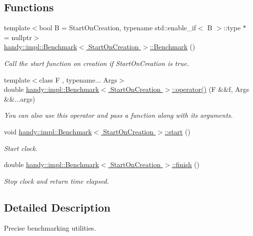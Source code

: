 \subsection*{Functions}
\begin{DoxyCompactItemize}
\item 
{\footnotesize template$<$bool B = Start\+On\+Creation, typename std\+::enable\+\_\+if$<$ B $>$\+::type $\ast$  = nullptr$>$ }\\\hyperlink{group__BenchmarkGroup_ga1ba032700225aabb43579c633d7838b1}{handy\+::impl\+::\+Benchmark$<$ Start\+On\+Creation $>$\+::\+Benchmark} ()
\begin{DoxyCompactList}\small\item\em Call the start function on creation if {\ttfamily Start\+On\+Creation} is {\ttfamily true}. \end{DoxyCompactList}\item 
{\footnotesize template$<$class F , typename... Args$>$ }\\double \hyperlink{group__BenchmarkGroup_ga5eee042d87e75a24021ad6851a2c10ec}{handy\+::impl\+::\+Benchmark$<$ Start\+On\+Creation $>$\+::operator()} (F \&\&f, Args \&\&...args)
\begin{DoxyCompactList}\small\item\em You can also use this operator and pass a function along with its arguments. \end{DoxyCompactList}\item 
void \hyperlink{group__BenchmarkGroup_gac7a583bb5a04f8028b8cc71a7db8fe80}{handy\+::impl\+::\+Benchmark$<$ Start\+On\+Creation $>$\+::start} ()
\begin{DoxyCompactList}\small\item\em Start clock. \end{DoxyCompactList}\item 
double \hyperlink{group__BenchmarkGroup_ga1d7b23a0eeb6280431e0265cbdac1962}{handy\+::impl\+::\+Benchmark$<$ Start\+On\+Creation $>$\+::finish} ()
\begin{DoxyCompactList}\small\item\em Stop clock and return time elapsed. \end{DoxyCompactList}\end{DoxyCompactItemize}


\subsection{Detailed Description}
Precise benchmarking utilities. 



